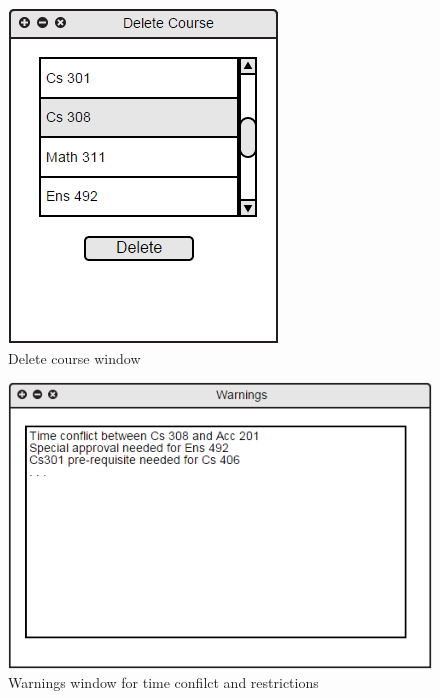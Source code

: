 \documentclass[twoside,letterpaper]{article}
\begin{document}
\begin{figure}[h!]
\centering
\includegraphics[keepaspectratio, scale=0.45]{Mockups/deleteCourse.png}
\caption{Delete course window}
\label{fig:mockupDelete}
\end{figure}

\begin{figure}[h!]
\centering
\includegraphics[keepaspectratio, scale=0.45]{Mockups/warning.png}
\caption{Warnings window for time confilct and restrictions}
\label{fig:mockupWarning}
\end{figure}
\end{document}
